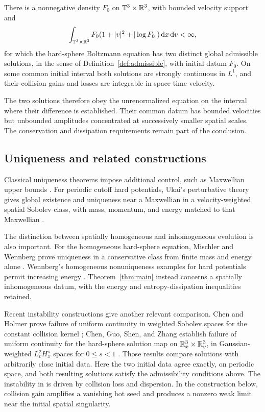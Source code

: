 \begin{theorem}\label{thm:main}
There is a nonnegative density \(F_0\) on \(\mathbb T^3\times\mathbb R^3\), with bounded
velocity support and
\[
\int_{\mathbb T^3\times\mathbb R^3}
 F_0(1+|v|^2+|\log F_0|)\,\mathrm d x\,\mathrm d v<\infty,
\]
for which the hard-sphere Boltzmann equation has two distinct global
admissible solutions, in the sense of Definition~\ref{def:admissible},
with initial datum \(F_0\).
On some common initial interval both solutions are strongly continuous
in \(L^1\), and their collision gains and losses are integrable in
space-time-velocity.
\end{theorem}

The two solutions therefore obey the unrenormalized equation on the
interval where their difference is established. Their common datum has
bounded velocities but unbounded amplitudes concentrated at successively
smaller spatial scales. The conservation and dissipation requirements
remain part of the conclusion.

\subsection{Uniqueness and related constructions}

Classical uniqueness theorems impose additional control, such as
Maxwellian upper bounds \cite{KanielShinbrot1978}. For periodic cutoff
hard potentials, Ukai's perturbative theory gives global existence and
uniqueness near a Maxwellian in a velocity-weighted spatial Sobolev class,
with mass, momentum, and energy matched to that Maxwellian
\cite[Theorem~1.2]{Ukai1974}.

The distinction between spatially homogeneous and inhomogeneous evolution
is also important. For the homogeneous hard-sphere equation, Mischler and
Wennberg prove uniqueness in a conservative class from finite mass and
energy alone \cite[Theorem~1.1]{MischlerWennberg1999}. Wennberg's
homogeneous nonuniqueness examples for hard potentials permit increasing
energy \cite{Wennberg1999}. Theorem~\ref{thm:main} instead concerns a
spatially inhomogeneous datum, with the energy and entropy-dissipation
inequalities retained.

Recent instability constructions give another relevant comparison.
Chen and Holmer prove failure of uniform continuity in weighted Sobolev
spaces for the constant collision kernel
\cite[Theorem~1.3]{ChenHolmer2024}; Chen, Guo, Shen, and Zhang establish failure of
uniform continuity for the hard-sphere solution map on
\(\mathbb R^3_x\times\mathbb R^3_v\), in Gaussian-weighted
\(L^2_vH^s_x\) spaces for \(0\le s<1\)
\cite[Theorem~1.1]{ChenGuoShenZhang2026}. Those results compare solutions
with arbitrarily close initial data. Here the two initial data agree
exactly, on periodic space, and both resulting solutions satisfy the
admissibility conditions above. The instability in
\cite{ChenGuoShenZhang2026} is driven by collision loss and dispersion.
In the construction below, collision gain amplifies a vanishing hot seed
and produces a nonzero weak limit near the
initial spatial singularity.

